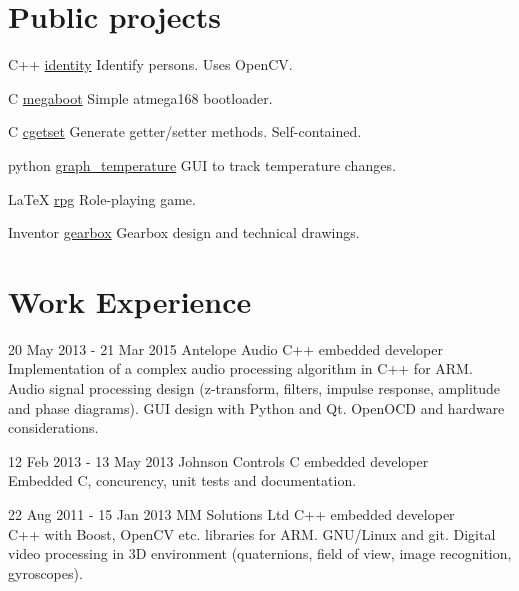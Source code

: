 \documentclass{tccv}
\begin{document}
\section{Public projects}
\begin{yearlist}
\item{C++}
     {\href{https://github.com/MiroslavVitkov/identity}{identity}}
     {Identify persons. Uses OpenCV.}

\item{C}
     {\href{https://github.com/MiroslavVitkov/megaboot}{megaboot}}
     {Simple atmega168 bootloader.}

\item{C}
     {\href{https://github.com/MiroslavVitkov/cgetset}{cgetset}}
     {Generate getter/setter methods. Self-contained.}

\item{python}
     {\href{https://github.com/MiroslavVitkov/graph_temperature}{graph\_temperature}}
     {GUI to track temperature changes.}

\item{LaTeX}
     {\href{https://github.com/MiroslavVitkov/rpg}{rpg}}
     {Role-playing game.}

\item{Inventor}
     {\href{https://github.com/MiroslavVitkov/gearbox}{gearbox}}
     {Gearbox design and technical drawings.}
\end{yearlist}


\pagebreak
\section{Work Experience}
\begin{eventlist}
\item{20 May 2013 - 21 Mar 2015}
     {Antelope Audio}
     {C++ embedded developer} \\
Implementation of a complex audio processing algorithm in C++ for ARM.
Audio signal processing design (z-transform, filters, impulse response, amplitude and phase diagrams).
GUI design with Python and Qt.
OpenOCD and hardware considerations.

\item{12 Feb 2013 - 13 May 2013}
     {Johnson Controls}
     {C embedded developer} \\
Embedded C, concurency, unit tests and documentation.

\item{22 Aug 2011 - 15 Jan 2013}
     {MM Solutions Ltd}
     {C++ embedded developer} \\
C++ with Boost, OpenCV etc. libraries for ARM.
GNU/Linux and git.
Digital video processing in 3D environment (quaternions, field of view, image recognition, gyroscopes).
\end{eventlist}
\end{document}
